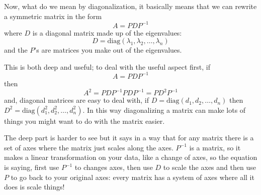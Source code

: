 \documentclass[12pt]{article}
\begin{document}
Now, what do we mean by diagonalization, it basically means that we can rewrite a symmetric matrix in the form
\begin{equation}
  A=PDP^{-1}
\end{equation}
where $D$ is a diagonal matrix made up of the eigenvalues:
\begin{equation}
  D=\text{diag}(\lambda_1,\lambda_2,\ldots,\lambda_n)
\end{equation}
and the $P$'s are matrices you make out of the eigenvalues. 

This is both deep and useful; to deal with the useful aspect first, if
\begin{equation}
  A=PDP^{-1}
\end{equation}
then
\begin{equation}
  A^2=PDP^{-1}PDP^{-1}=PD^2P^{-1}
\end{equation}
and, diagonal matrices are easy to deal with, if
$D=\text{diag}(d_1,d_2,\ldots,d_n)$ then
$D^2=\text{diag}(d_1^2,d_2^2,\ldots,d_n^2)$. In this way diagonalizing
a matrix can make lots of things you might want to do with the matrix
easier.

The deep part is harder to see but it says in a way that for any
matrix there is a set of axes where the matrix just scales along the
axes. $P^{-1}$ is a matrix, so it makes a linear transformation on
your data, like a change of axes, so the equation is saying, first use
$P^{-1}$ to changes axes, then use $D$ to scale the axes and then use
$P$ to go back to your original axes: every matrix has a system of
axes where all it does is scale things!
\end{document}
